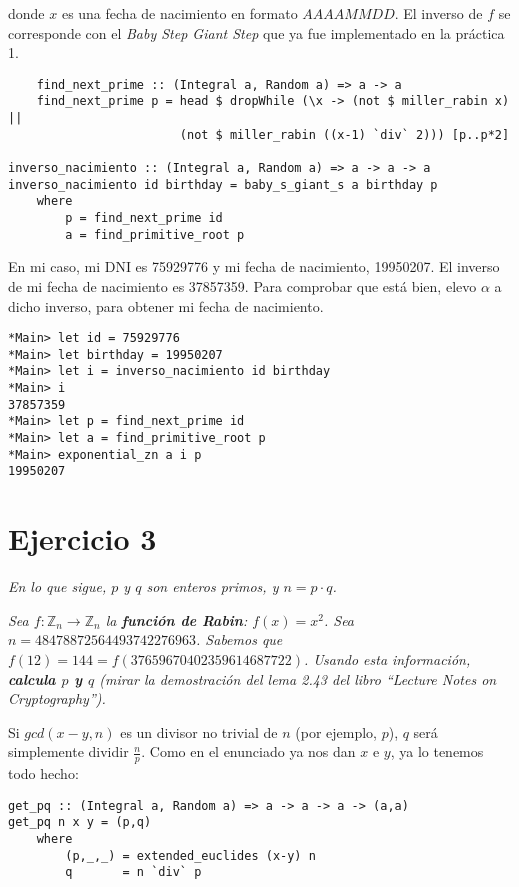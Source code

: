 \documentclass[10pt,spanish]{article}
\begin{document}
donde $x$ es una fecha de nacimiento en formato $AAAAMMDD$. El inverso de $f$ se corresponde con el \textit{\textcolor{azul}{Baby Step Giant Step}} que ya fue implementado en la práctica 1.

\begin{verbatim}
    find_next_prime :: (Integral a, Random a) => a -> a
    find_next_prime p = head $ dropWhile (\x -> (not $ miller_rabin x) || 
                        (not $ miller_rabin ((x-1) `div` 2))) [p..p*2]

inverso_nacimiento :: (Integral a, Random a) => a -> a -> a
inverso_nacimiento id birthday = baby_s_giant_s a birthday p
    where
        p = find_next_prime id
        a = find_primitive_root p
\end{verbatim}

En mi caso, mi DNI es 75929776 y mi fecha de nacimiento, 19950207. El inverso de mi fecha de nacimiento es 37857359. Para comprobar que está bien, elevo $\alpha$ a dicho inverso, para obtener mi fecha de nacimiento.

\begin{verbatim}
*Main> let id = 75929776
*Main> let birthday = 19950207
*Main> let i = inverso_nacimiento id birthday
*Main> i
37857359
*Main> let p = find_next_prime id
*Main> let a = find_primitive_root p
*Main> exponential_zn a i p
19950207
\end{verbatim}

\section{\textcolor{azul}Ejercicio 3}
\textit{En lo que sigue, $p$ y $q$ son enteros primos, y $n = p \cdot q$.}

\textit{Sea $f: \mathbb{Z}_n \rightarrow \mathbb{Z}_n$ la \textbf{\textcolor{azul}{función de Rabin}}: $f(x) = x^2$. Sea $n = 48478872564493742276963$. Sabemos que $f(12) = 144= f(37659670402359614687722)$. Usando esta información, \textbf{\textcolor{azul}{calcula $p$ y $q$}} (mirar la demostración del lema 2.43 del libro ``Lecture Notes on Cryptography'').}

Si $gcd(x-y,n)$ es un divisor no trivial de $n$ (por ejemplo, $p$), $q$ será simplemente dividir $\frac{n}{p}$. Como en el enunciado ya nos dan $x$ e $y$, ya lo tenemos todo hecho:

\begin{verbatim}
get_pq :: (Integral a, Random a) => a -> a -> a -> (a,a)
get_pq n x y = (p,q)
    where
        (p,_,_) = extended_euclides (x-y) n
        q       = n `div` p
\end{verbatim}
\end{document}
